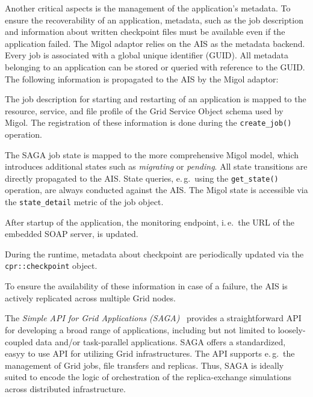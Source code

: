 \documentclass[times, 10pt, twocolumn]{article}
\begin{document}
Another critical aspects is the management of the application's
metadata. To ensure the recoverability of an application, metadata,
such as the job description and information about written checkpoint
files must be available even if the application failed. The Migol
adaptor relies on the AIS as the metadata backend. Every job is
associated with a global unique identifier (GUID).
All metadata belonging to an application can be stored or queried with
reference to the GUID.  The following information is propagated to the
AIS by the Migol adaptor:

\begin{compactitem}
\item The job description for starting and restarting of an
  application is mapped to the resource, service, and file profile of
  the Grid Service Object schema used by Migol. The registration of
  these information is done during the \texttt{create\_job()}
  operation.
\item The SAGA job state is mapped to the more comprehensive Migol
  model, which introduces additional states such as \emph{migrating}
  or \emph{pending}. All state transitions are directly propagated to
  the AIS. State queries, e.\,g.\ using the \texttt{get\_state()}
  operation, are always conducted against the AIS. The Migol state is
  accessible via the \texttt{state\_detail} metric of the job object.
\item After startup of the application, the monitoring endpoint,
  i.\,e.\ the URL of the embedded SOAP server, is updated.
\item During the runtime, metadata about checkpoint are periodically
  updated via the \texttt{cpr::checkpoint} object.
\end{compactitem}

To ensure the availability of these information in case of a failure,
the AIS is actively replicated across multiple Grid nodes.




The \emph{Simple API for Grid Applications (SAGA)}~\cite{saga_gfd90}
provides a straightforward API for developing a broad range of
applications, including but not limited to loosely-coupled data and/or
task-parallel applications.
SAGA offers a standardized, easyy to use API for utilizing Grid
infrastructures. The API supports e.\,g.\ the management of Grid jobs,
file transfers and replicas. Thus, SAGA is ideally suited to encode
the logic of orchestration of the replica-exchange simulations across
distributed infrastructure.
\end{document}
